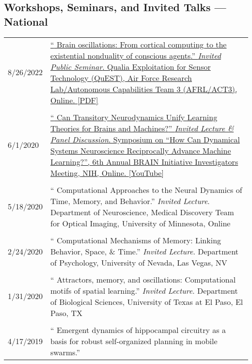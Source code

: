 \documentclass[10pt]{article}
\newcommand{\itemtitle}[1]{{\color{hopkinsblue}\ul{#1}}}
\newcommand{\unpubtitle}[1]{{\color{hopkinsblue} #1}}
\begin{document}
\subsection*{Workshops, Seminars, and Invited Talks --- National}
\label{sec:natltalks}

\begin{longtable}{@{\hspace{0.2in}}l>{\raggedright\arraybackslash}p{}}
  8/26/2022 \hspace{0.3in} &
  \href{https://jdmonaco.com/files/monaco-2022-afrl-quest-slides.pdf}
  {``\unpubtitle{Brain oscillations: From cortical computing to the existential
    nonduality of conscious agents}.'' \emph{Invited Public Seminar}. Qualia
    Exploitation for Sensor Technology (QuEST), Air Force Research Lab/Autonomous
  Capabilities Team 3 (AFRL/ACT3), Online. \itemtitle{[PDF]}}\\
  \tabularnewline
  6/1/2020 \hspace{0.3in} & \label{sec:symposium}
  \href{https://youtu.be/2jy1ENYHRAw?t=902}{``\unpubtitle{Can Transitory
    Neurodynamics Unify Learning Theories for Brains and Machines?}''
    \emph{Invited Lecture \& Panel Discussion}. Symposium on ``How Can Dynamical
    Systems Neuroscience Reciprocally Advance Machine Learning?'', 6th Annual
  BRAIN Initiative Investigators Meeting, NIH, Online. \itemtitle{[YouTube]}}\\
  \tabularnewline
  5/18/2020 \hspace{0.3in} & ``\unpubtitle{Computational Approaches to the
  Neural Dynamics of Time, Memory, and Behavior}.'' \emph{Invited Lecture}.
  Department of Neuroscience, Medical Discovery Team for Optical Imaging,
  University of Minnesota, Online\\
  \tabularnewline
  2/24/2020 \hspace{0.3in} & ``\unpubtitle{Computational Mechanisms of Memory:
  Linking Behavior, Space, \& Time}.'' \emph{Invited Lecture}. Department of
  Psychology, University of Nevada, Las Vegas, NV\\
  \tabularnewline
  1/31/2020 \hspace{0.3in} & ``\unpubtitle{Attractors, memory, and oscillations:
  Computational motifs of spatial learning}.'' \emph{Invited Lecture}.
  Department of Biological Sciences, University of Texas at El Paso, El Paso, TX\\
  \tabularnewline
  4/17/2019 \hspace{0.3in} & ``\unpubtitle{Emergent dynamics of hippocampal
  circuitry as a basis for robust self-organized planning in mobile swarms}.''

\end{longtable}
\end{document}
